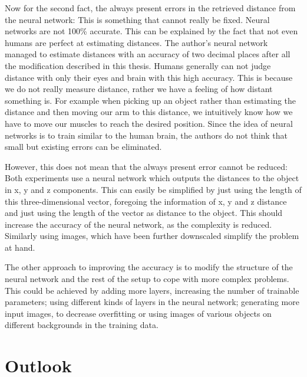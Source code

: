 Now for the second fact, the always present errors in the retrieved distance from the neural network: This is something that cannot really be fixed. Neural networks are not 100\% accurate. This can be explained by the fact that not even humans are perfect at estimating distances. The author's neural network managed to estimate distances with an accuracy of two decimal places after all the modification described in this thesis. Humans generally can not judge distance with only their eyes and brain with this high accuracy. This is because we do not really measure distance, rather we have a feeling of how distant something is. For example when picking up an object rather than estimating the distance and then moving our arm to this distance, we intuitively know how we have to move our muscles to reach the desired position. Since the idea of neural networks is to train similar to the human brain, the authors do not think that small but existing errors can be eliminated. 

However, this does not mean that the always present error cannot be reduced: Both experiments use a neural network which outputs the distances to the object in x, y and z components. This can easily be simplified by just using the length of this three-dimensional vector, foregoing the information of x, y and z distance and just using the length of the vector as distance to the object. This should increase the accuracy of the neural network, as the complexity is reduced. Similarly using images, which have been further downscaled simplify the problem at hand.

The other approach to improving the accuracy is to modify the structure of the neural network and the rest of the setup to cope with more complex problems. This could be achieved by adding more layers, increasing the number of trainable parameters; using different kinds of layers in the neural network; generating more input images, to decrease overfitting or using images of various objects on different backgrounds in the training data.



\section{Outlook}



\filbreak